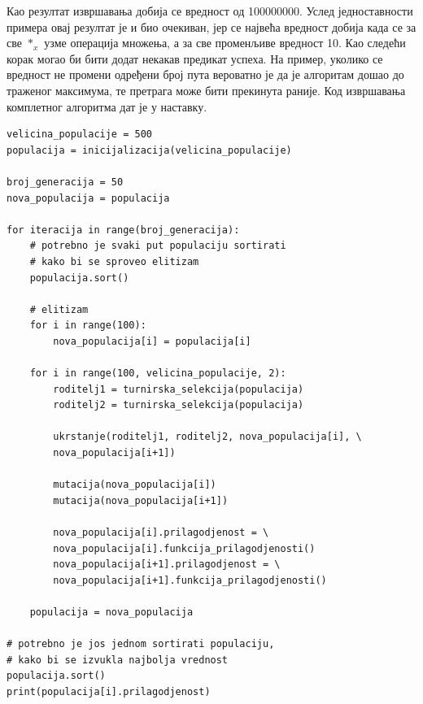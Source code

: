 \documentclass[a4paper]{article}
\begin{document}
Као резултат извршавања добија се вредност од 100000000. Услед једноставности примера овај резултат је и био очекиван, јер се највећа вредност добија када се за све $*_x$ узме операција множења, а за све променљиве вредност 10. Као следећи корак могао би бити додат некакав предикат успеха. На пример, уколико се вредност не промени одређени број пута вероватно је да је алгоритам дошао до траженог максимума, те претрага може бити прекинута раније. Код извршавања комплетног алгоритма дат је у наставку.

\bigskip
\bigskip
\begin{lstlisting}[frame=single]
velicina_populacije = 500
populacija = inicijalizacija(velicina_populacije)

broj_generacija = 50
nova_populacija = populacija

for iteracija in range(broj_generacija):
    # potrebno je svaki put populaciju sortirati 
    # kako bi se sproveo elitizam 
    populacija.sort()

    # elitizam
    for i in range(100):
        nova_populacija[i] = populacija[i]

    for i in range(100, velicina_populacije, 2):
        roditelj1 = turnirska_selekcija(populacija)
        roditelj2 = turnirska_selekcija(populacija)

        ukrstanje(roditelj1, roditelj2, nova_populacija[i], \
        nova_populacija[i+1])

        mutacija(nova_populacija[i])
        mutacija(nova_populacija[i+1])

        nova_populacija[i].prilagodjenost = \
        nova_populacija[i].funkcija_prilagodjenosti()
        nova_populacija[i+1].prilagodjenost = \
        nova_populacija[i+1].funkcija_prilagodjenosti()

    populacija = nova_populacija

# potrebno je jos jednom sortirati populaciju, 
# kako bi se izvukla najbolja vrednost
populacija.sort()
print(populacija[i].prilagodjenost)
\end{lstlisting}
\end{document}
